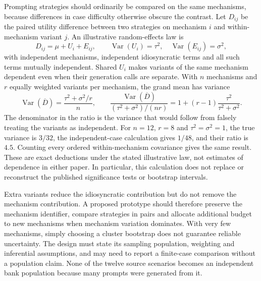 Prompting strategies should ordinarily be compared on the same mechanisms,
because differences in case difficulty otherwise obscure the contrast. Let
$D_{ij}$ be the paired utility difference between two strategies on mechanism
$i$ and within-mechanism variant $j$. An illustrative random-effects law is
\begin{equation}
 D_{ij}=\mu+U_i+E_{ij},\qquad
 \operatorname{Var}(U_i)=\tau^2,\quad
 \operatorname{Var}(E_{ij})=\sigma^2,
 \label{exec17:benchmark-cluster-law}
\end{equation}
with independent mechanisms, independent idiosyncratic terms and all such
terms mutually independent. Shared $U_i$ makes variants of the same mechanism
dependent even when their generation calls are separate. With $n$ mechanisms
and $r$ equally weighted variants per mechanism, the grand mean has variance
\begin{equation}
 \operatorname{Var}(\overline D)
 =\frac{\tau^2+\sigma^2/r}{n},\qquad
 \frac{\operatorname{Var}(\overline D)}{(\tau^2+\sigma^2)/(nr)}
 =1+(r-1)\frac{\tau^2}{\tau^2+\sigma^2}.
 \label{exec17:benchmark-cluster-variance}
\end{equation}
The denominator in the ratio is the variance that would follow from falsely
treating the variants as independent. For $n=12$, $r=8$ and
$\tau^2=\sigma^2=1$, the true variance is $3/32$, the independent-case
calculation gives $1/48$, and their ratio is $4.5$. Counting every ordered
within-mechanism covariance gives the same result. These are exact deductions
under the stated illustrative law, not estimates of dependence in either
paper. In particular, this calculation does not replace or reconstruct the
published significance tests or bootstrap intervals.
\citep{exec17_benchmark_exact}

Extra variants reduce the idiosyncratic contribution but do not remove the
mechanism contribution. A proposed prototype should therefore preserve the
mechanism identifier, compare strategies in pairs and allocate additional
budget to new mechanisms when mechanism variation dominates. With very few
mechanisms, simply choosing a cluster bootstrap does not guarantee reliable
uncertainty. The design must state its sampling population, weighting and
inferential assumptions, and may need to report a finite-case comparison
without a population claim. None of the twelve source scenarios becomes an
independent bank population because many prompts were generated from it.

